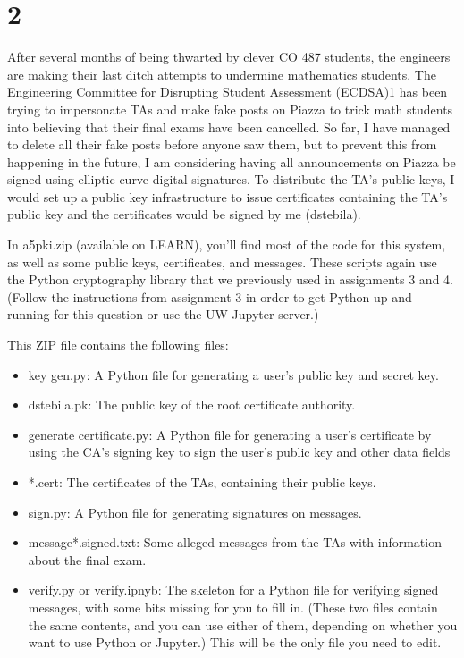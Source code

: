 \documentclass[11pt]{article}
\begin{document}
\newpage

\section{2}

After several months of being thwarted by clever CO 487 students, the engineers are making their last ditch attempts to undermine mathematics students. The Engineering Committee for Disrupting Student Assessment (ECDSA)1 has been trying to impersonate TAs and make fake posts on Piazza to trick math students into believing that their final exams have been cancelled. So far, I have managed to delete all their fake posts before anyone saw them, but to prevent this from happening in the future, I am considering having all announcements on Piazza be signed using elliptic curve digital signatures. To distribute the TA's public keys, I would set up a public key infrastructure to issue certificates containing the TA's public key and the certificates would be signed by me (dstebila).

In a5pki.zip (available on LEARN), you'll find most of the code for this system, as well as some public keys, certificates, and messages. These scripts again use the Python cryptography library that we previously used in assignments 3 and 4. (Follow the instructions from assignment 3 in order to get Python up and running for this question or use the UW Jupyter server.)

This ZIP file contains the following files:
\begin{itemize}
    \item key gen.py: A Python file for generating a user's public key and secret key.
    \item dstebila.pk: The public key of the root certificate authority.
    \item generate certificate.py: A Python file for generating a user's certificate by using the CA's signing key to sign the user's public key and other data fields
    \item *.cert: The certificates of the TAs, containing their public keys.
    \item sign.py: A Python file for generating signatures on messages.
    \item message*.signed.txt: Some alleged messages from the TAs with information about the final exam.
    \item verify.py or verify.ipnyb: The skeleton for a Python file for verifying signed messages, with some bits missing for you to fill in. (These two files contain the same contents, and you can use either of them, depending on whether you want to use Python or Jupyter.) This will be the only file you need to edit.
\end{itemize}
\end{document}
